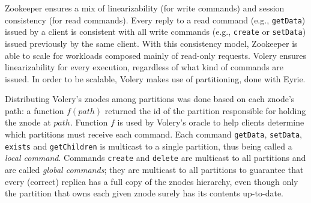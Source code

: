 
Zookeeper ensures a mix of linearizability (for write commands) and session consistency (for read commands).
Every reply to a read command (e.g., \verb#getData#) issued by a client is consistent with all write commands (e.g., \verb#create# or \verb#setData#) issued previously by the same client. 
With this consistency model, Zookeeper is able to scale for workloads composed mainly of read-only requests. 
Volery ensures linearizability for every execution, regardless of what kind of commands are issued. 
In order to be scalable, Volery makes use of partitioning, done with Eyrie.

Distributing Volery's znodes among partitions was done based on each znode's path: a function $f(path)$ returned the id of the partition responsible for holding the znode at $path$. 
Function $f$ is used by Volery's oracle to help clients determine which partitions must receive each command. 
Each command \verb#getData#, \verb#setData#, \verb#exists# and \verb#getChildren# is multicast to a single partition, thus being called a \emph{local command}. Commands \verb#create# and \verb#delete# are multicast to all partitions and are called \emph{global commands}; they are multicast to all partitions to guarantee that every (correct) replica has a full copy of the znodes hierarchy, even though only the partition that owns each given znode surely has its contents up-to-date. 

